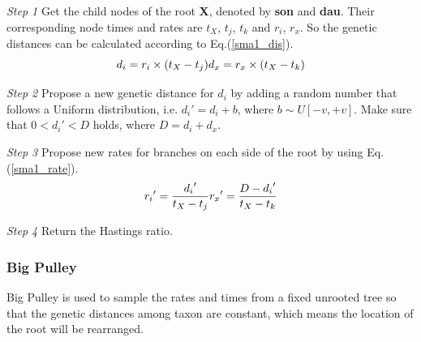 \documentclass{bmcart}
\begin{document}
\emph{Step 1} Get the child nodes of the root \textbf{X}, denoted by \textbf{son} and \textbf{dau}. Their corresponding node times and rates are $t_X$, $t_j$, $t_k$ and $r_i$, $r_x$. So the genetic distances can be calculated according to Eq.(\ref{sma1_dis}).
\begin{equation}
\label{sma1_dis}
{d_i} = {r_i} \times ({{t_X} - {t_j}})\\
{d_x} = {r_x} \times ({{t_X} - {t_k}})
 \end{equation}

\emph{Step 2} Propose a new genetic distance for $d_i$ by adding a random number that follows a Uniform distribution, i.e.  ${d_i}' = {d_i} + b$, where $b \sim U[ - v, + v]$. Make sure that $0 < {d_i}' < D$ holds, where $D = {d_i} + {d_x}$.

\emph{Step 3} Propose new rates for branches on each side of the root by using Eq.(\ref{sma1_rate}).
\begin{equation}
\label{sma1_rate}
{r_i}' = \frac{{{d_i}'}}{{{t_X} - {t_j}}}\\
{r_x}' = \frac{{D - {d_i}'}}{{{t_X} - {t_k}}}
 \end{equation}

\emph{Step 4} Return the Hastings ratio.
\subsubsection*{Big Pulley}
Big Pulley is used to sample the rates and times from a fixed unrooted tree so that the genetic distances among taxon are constant, which means the location of the root will be rearranged.
\end{document}
